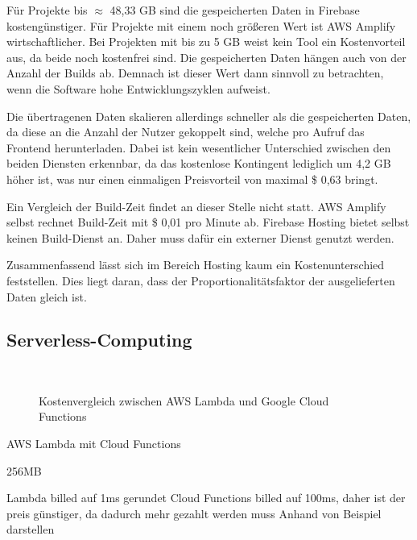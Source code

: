Für Projekte bis $\approx$ 48,33 GB sind die gespeicherten Daten in Firebase kostengünstiger. Für Projekte mit einem noch größeren Wert ist \ac{AWS} Amplify wirtschaftlicher. Bei Projekten mit bis zu 5 GB weist kein Tool ein Kostenvorteil aus, da beide noch kostenfrei sind. Die gespeicherten Daten hängen auch von der Anzahl der Builds ab. Demnach ist dieser Wert dann sinnvoll zu betrachten, wenn die Software hohe Entwicklungszyklen aufweist.

Die übertragenen Daten skalieren allerdings schneller als die gespeicherten Daten, da diese an die Anzahl der Nutzer gekoppelt sind, welche pro Aufruf das Frontend herunterladen. Dabei ist kein wesentlicher Unterschied zwischen den beiden Diensten erkennbar, da das kostenlose Kontingent lediglich um 4,2 GB höher ist, was nur einen einmaligen Preisvorteil von maximal \$ 0,63 bringt.

Ein Vergleich der Build-Zeit findet an dieser Stelle nicht statt. \ac{AWS} Amplify selbst rechnet Build-Zeit mit \$ 0,01 pro Minute ab. Firebase Hosting bietet selbst keinen Build-Dienst an. Daher muss dafür ein externer Dienst genutzt werden.

Zusammenfassend lässt sich im Bereich Hosting kaum ein Kostenunterschied feststellen. Dies liegt daran, dass der  Proportionalitätsfaktor der ausgelieferten Daten gleich ist.

\subsection{Serverless-Computing}

\begin{figure}
  \centering
  \quad
  \\
  \quad
  \caption{Kostenvergleich zwischen AWS Lambda und Google Cloud Functions}
  \label{kostenvergleichFunctions}
\end{figure}

AWS Lambda mit Cloud Functions

256MB

Lambda billed auf 1ms gerundet
Cloud Functions billed auf 100ms, daher ist der preis günstiger, da dadurch mehr gezahlt werden muss
Anhand von Beispiel darstellen

